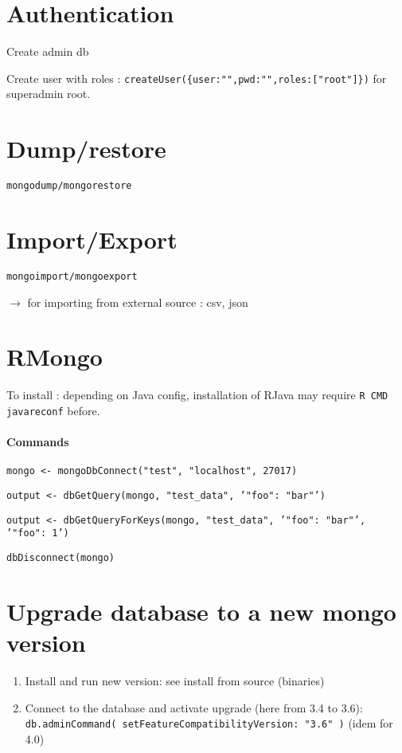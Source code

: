 \section*{Authentication}

Create admin db

Create user with roles : \texttt{createUser(\{user:"",pwd:"",roles:["root"]\})} for superadmin root.


\section*{Dump/restore}

\texttt{mongodump/mongorestore}


\section*{Import/Export}

\texttt{mongoimport/mongoexport}

$\rightarrow$ for importing from external source : csv, json



\section*{RMongo}

To install : depending on Java config, installation of RJava may require \texttt{R CMD javareconf} before.


\paragraph{Commands}

\texttt{mongo <- mongoDbConnect("test", "localhost", 27017)}

\texttt{output <- dbGetQuery(mongo, "test{\_}data",
'{"foo": "bar"}')}

\texttt{output <- dbGetQueryForKeys(mongo, "test{\_}data",
'{"foo": "bar"}', '{"foo": 1}')}

\texttt{dbDisconnect(mongo)}




\section*{Upgrade database to a new mongo version}

\begin{enumerate}
	\item Install and run new version: see install from source (binaries)
	\item Connect to the database and activate upgrade (here from 3.4 to 3.6): \texttt{db.adminCommand({ setFeatureCompatibilityVersion: "3.6" })} (idem for 4.0)
\end{enumerate}

